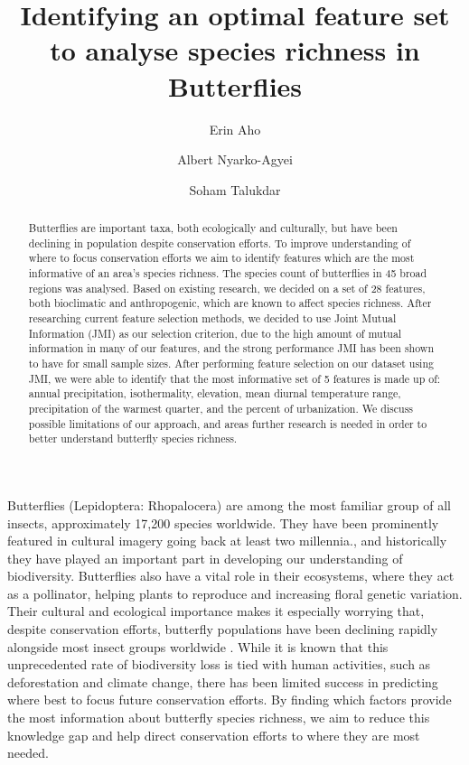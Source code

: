 \documentclass[prl,showpacs,superscriptaddress,twocolumn,longbibliography]{revtex4-1}
\begin{document}
\author{Erin Aho}
\author{Albert Nyarko-Agyei}
\author{Soham Talukdar}

\title{Identifying an optimal feature set to analyse species richness in Butterflies}


\begin{abstract}
Butterflies are important taxa, both ecologically and culturally, but have been declining in population despite conservation efforts. To improve understanding of where to focus conservation efforts we aim to identify features which are the most informative of an area's species richness.
The species count of butterflies in 45 broad regions was analysed. Based on existing research, we decided on a set of 28 features, both bioclimatic and anthropogenic, which are known to affect species richness. After researching current feature selection methods, we decided to use Joint Mutual Information (JMI) as our selection criterion, due to the high amount of mutual information in many of our features, and the strong performance JMI has been shown to have for small sample sizes. After performing feature selection on our dataset using JMI, we were able to identify that the most informative set of 5 features is made up of: annual precipitation, isothermality, elevation,  mean diurnal temperature range, precipitation of the warmest quarter, and the percent of urbanization. We discuss possible limitations of our approach, and areas further research is needed in order to better understand butterfly species richness.
\end{abstract}

\maketitle

Butterflies (Lepidoptera: Rhopalocera) are among the most familiar group of all insects, approximately 17,200 species worldwide\cite{shields_world_1989}. They have been prominently featured in cultural imagery going back at least two millennia.\cite{Dicke2000}, and historically they have played an important part in developing our understanding of biodiversity\cite{levin_butterflies_2001}. 
\newline
\newline
Butterflies also have a vital role in their ecosystems, where they act as a pollinator, helping plants to reproduce and increasing floral genetic variation\cite{ghazanfar_butterflies_2016}.
\newline
\newline
Their cultural and ecological importance makes it especially worrying that, despite conservation efforts, butterfly populations have been declining rapidly alongside most insect groups worldwide \cite{Wagner2021}. While it is known that this unprecedented rate of biodiversity loss is tied with human activities, such as deforestation and climate change\cite{white_human_2007, montgomery_is_2020, clark_effects_2007}, there has been limited success in predicting where best to focus future conservation efforts. By finding which factors provide the most information about butterfly species richness, we aim to reduce this knowledge gap and help direct conservation efforts to where they are most needed.
\end{document}
